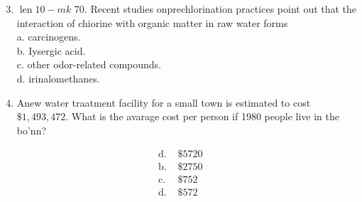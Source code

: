 \documentclass[10pt]{article}
\begin{document}
\begin{enumerate}
  \setcounter{enumi}{2}
  \item $\operatorname{len} 10-m k$ 70. Recent studies onprechlorination practices point out that the interaction of chiorine with organic matter in raw water forms\\
a. carcinogens.\\
b. Iysergic acid.\\
c. other odor-related compounds.\\
d. irinalomethanes.

  \item Anew water traatment facility for a small town is estimated to cost $\$ 1,493,472$. What is the avarage cost per person if 1980 people live in the bo'nn?

\end{enumerate}

$$
\begin{array}{ll}
\text { d. } & \$ 5720 \\
\text { b. } & \$ 2750 \\
\text { c. } & \$ 752 \\
\text { d. } & \$ 572
\end{array}
$$
\end{document}
